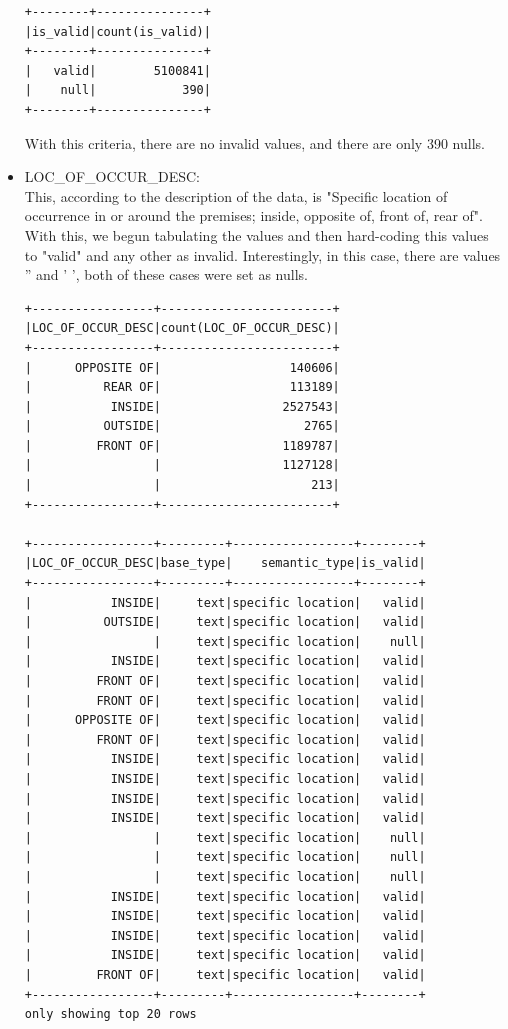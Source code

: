 \documentclass{article}
\begin{document}
\begin{itemize}
\begin{verbatim}
+--------+---------------+
|is_valid|count(is_valid)|
+--------+---------------+
|   valid|        5100841|
|    null|            390|
+--------+---------------+

\end{verbatim}

With this criteria, there are no invalid values, and there are only 390 nulls.

\item LOC\_OF\_OCCUR\_DESC: \\
This, according to the description of the data, is "Specific location of occurrence in or around the premises; inside, opposite of, front of, rear of". With this, we begun tabulating the values and then hard-coding this values to "valid" and any other as invalid. Interestingly, in this case, there are values '' and ' ', both of these cases were set as nulls. 

\begin{verbatim}
+-----------------+------------------------+
|LOC_OF_OCCUR_DESC|count(LOC_OF_OCCUR_DESC)|
+-----------------+------------------------+
|      OPPOSITE OF|                  140606|
|          REAR OF|                  113189|
|           INSIDE|                 2527543|
|          OUTSIDE|                    2765|
|         FRONT OF|                 1189787|
|                 |                 1127128|
|                 |                     213|
+-----------------+------------------------+

+-----------------+---------+-----------------+--------+
|LOC_OF_OCCUR_DESC|base_type|    semantic_type|is_valid|
+-----------------+---------+-----------------+--------+
|           INSIDE|     text|specific location|   valid|
|          OUTSIDE|     text|specific location|   valid|
|                 |     text|specific location|    null|
|           INSIDE|     text|specific location|   valid|
|         FRONT OF|     text|specific location|   valid|
|         FRONT OF|     text|specific location|   valid|
|      OPPOSITE OF|     text|specific location|   valid|
|         FRONT OF|     text|specific location|   valid|
|           INSIDE|     text|specific location|   valid|
|           INSIDE|     text|specific location|   valid|
|           INSIDE|     text|specific location|   valid|
|           INSIDE|     text|specific location|   valid|
|                 |     text|specific location|    null|
|                 |     text|specific location|    null|
|                 |     text|specific location|    null|
|           INSIDE|     text|specific location|   valid|
|           INSIDE|     text|specific location|   valid|
|           INSIDE|     text|specific location|   valid|
|           INSIDE|     text|specific location|   valid|
|         FRONT OF|     text|specific location|   valid|
+-----------------+---------+-----------------+--------+
only showing top 20 rows


\end{verbatim}
\end{itemize}
\end{document}
